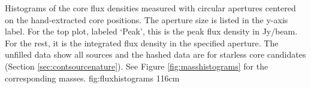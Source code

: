 \documentclass{emulateapj}
\begin{document}
% 



{Histograms of the core flux densities measured with circular apertures centered
on the hand-extracted core positions.  The aperture size is listed 
in the y-axis label.  For the top plot, labeled `Peak', this is the peak
flux density in Jy/beam.  For the rest, it is the integrated flux density
in the specified aperture.  The unfilled data show all sources and the hashed
data are for starless core candidates (Section \ref{sec:contsourcenature}).
See Figure \ref{fig:masshistograms} for the corresponding masses.}
{fig:fluxhistograms}
{1}{16cm}



\end{document}
